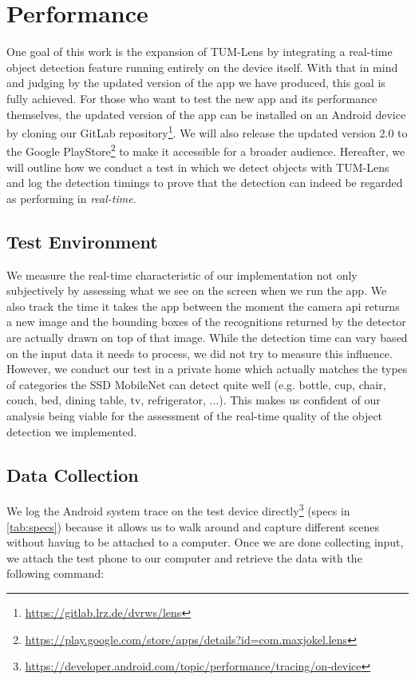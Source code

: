 \documentclass[
			   fontsize=11pt,
               paper=a4,
               bibliography=totoc,
               idxtotoc,
               headsepline,
               footsepline,
               footinclude=false,
               BCOR=12mm,
               DIV=13,
               openany,   %
               oneside    %
               ]
               {scrbook}
\begin{document}
\section{Performance} \label{sec:performance}

One goal of this work is the expansion of TUM-Lens by integrating a real-time object detection feature running entirely on the device itself. With that in mind and judging by the updated version of the app we have produced, this goal is fully achieved. For those who want to test the new app and its performance themselves, the updated version of the app can be installed on an Android device by cloning our GitLab repository\footnote{\url{https://gitlab.lrz.de/dvrws/lens}}. We will also release the updated version 2.0 to the Google PlayStore\footnote{\url{https://play.google.com/store/apps/details?id=com.maxjokel.lens}} to make it accessible for a broader audience. Hereafter, we will outline how we conduct a test in which we detect objects with TUM-Lens and log the detection timings to prove that the detection can indeed be regarded as performing in \textit{real-time}.

\subsection{Test Environment}
We measure the real-time characteristic of our implementation not only subjectively by assessing what we see on the screen when we run the app. We also track the time it takes the app between the moment the camera \gls{api} returns a new image and the bounding boxes of the recognitions returned by the detector are actually drawn on top of that image. While the detection time can vary based on the input data it needs to process, we did not try to measure this influence. However, we conduct our test in a private home which actually matches the types of categories the SSD MobileNet can detect quite well (e.g. bottle, cup, chair, couch, bed, dining table, tv, refrigerator, ...). This makes us confident of our analysis being viable for the assessment of the real-time quality of the object detection we implemented.

\subsection{Data Collection}
We log the Android system trace on the test device directly\footnote{\url{https://developer.android.com/topic/performance/tracing/on-device}} (specs in \autoref{tab:specs}) because it allows us to walk around and capture different scenes without having to be attached to a computer. Once we are done collecting input, we attach the test phone to our computer and retrieve the data with the following command:
\end{document}
